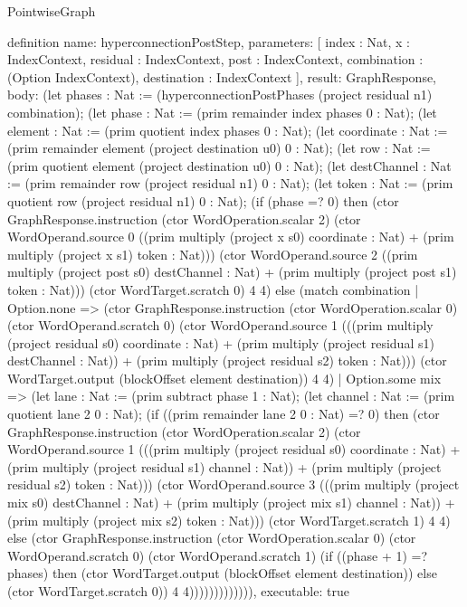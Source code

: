 \begin{lexlean}{PointwiseGraph}
\begin{semanticmodule}
definition{
  name: hyperconnectionPostStep,
  parameters: [
    index : Nat,
    x : IndexContext,
    residual : IndexContext,
    post : IndexContext,
    combination : (Option IndexContext),
    destination : IndexContext
  ],
  result: GraphResponse,
  body: (let phases : Nat := (hyperconnectionPostPhases (project residual n1) combination); (let phase : Nat := (prim remainder index phases 0 : Nat); (let element : Nat := (prim quotient index phases 0 : Nat); (let coordinate : Nat := (prim remainder element (project destination u0) 0 : Nat); (let row : Nat := (prim quotient element (project destination u0) 0 : Nat); (let destChannel : Nat := (prim remainder row (project residual n1) 0 : Nat); (let token : Nat := (prim quotient row (project residual n1) 0 : Nat); (if (phase =? 0) then (ctor GraphResponse.instruction (ctor WordOperation.scalar 2) (ctor WordOperand.source 0 ((prim multiply (project x s0) coordinate : Nat) + (prim multiply (project x s1) token : Nat))) (ctor WordOperand.source 2 ((prim multiply (project post s0) destChannel : Nat) + (prim multiply (project post s1) token : Nat))) (ctor WordTarget.scratch 0) 4 4) else (match combination
    | Option.none => (ctor GraphResponse.instruction (ctor WordOperation.scalar 0) (ctor WordOperand.scratch 0) (ctor WordOperand.source 1 (((prim multiply (project residual s0) coordinate : Nat) + (prim multiply (project residual s1) destChannel : Nat)) + (prim multiply (project residual s2) token : Nat))) (ctor WordTarget.output (blockOffset element destination)) 4 4)
    | Option.some mix => (let lane : Nat := (prim subtract phase 1 : Nat); (let channel : Nat := (prim quotient lane 2 0 : Nat); (if ((prim remainder lane 2 0 : Nat) =? 0) then (ctor GraphResponse.instruction (ctor WordOperation.scalar 2) (ctor WordOperand.source 1 (((prim multiply (project residual s0) coordinate : Nat) + (prim multiply (project residual s1) channel : Nat)) + (prim multiply (project residual s2) token : Nat))) (ctor WordOperand.source 3 (((prim multiply (project mix s0) destChannel : Nat) + (prim multiply (project mix s1) channel : Nat)) + (prim multiply (project mix s2) token : Nat))) (ctor WordTarget.scratch 1) 4 4) else (ctor GraphResponse.instruction (ctor WordOperation.scalar 0) (ctor WordOperand.scratch 0) (ctor WordOperand.scratch 1) (if ((phase + 1) =? phases) then (ctor WordTarget.output (blockOffset element destination)) else (ctor WordTarget.scratch 0)) 4 4))))))))))))),
  executable: true
}


\end{semanticmodule}
\end{lexlean}
